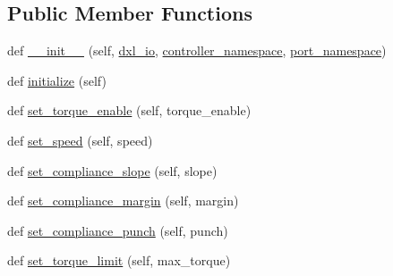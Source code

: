 \subsection*{Public Member Functions}
\begin{DoxyCompactItemize}
\item 
def \hyperlink{classdynamixel__controllers_1_1joint__torque__controller__dual__motor_1_1_joint_torque_controller_dual_motor_ac143e1d5e8d4ec9b2f1419a03e45092c}{\+\_\+\+\_\+init\+\_\+\+\_\+} (self, \hyperlink{classdynamixel__controllers_1_1joint__controller_1_1_joint_controller_a8be2fb1ed88aee6590c938122361c780}{dxl\+\_\+io}, \hyperlink{classdynamixel__controllers_1_1joint__controller_1_1_joint_controller_a8b34f86e463a0ce3fcf52a09b6ea7dc2}{controller\+\_\+namespace}, \hyperlink{classdynamixel__controllers_1_1joint__controller_1_1_joint_controller_ac89de71afa48761fb662ac2917a5b9d3}{port\+\_\+namespace})
\item 
def \hyperlink{classdynamixel__controllers_1_1joint__torque__controller__dual__motor_1_1_joint_torque_controller_dual_motor_a02bd4c16843e2e44bdd210395e83efb5}{initialize} (self)
\item 
def \hyperlink{classdynamixel__controllers_1_1joint__torque__controller__dual__motor_1_1_joint_torque_controller_dual_motor_adb706374f9a3e4a3cddb1ebafde0c15a}{set\+\_\+torque\+\_\+enable} (self, torque\+\_\+enable)
\item 
def \hyperlink{classdynamixel__controllers_1_1joint__torque__controller__dual__motor_1_1_joint_torque_controller_dual_motor_ad10fda7d37dcce2101585315ccaa6d2c}{set\+\_\+speed} (self, speed)
\item 
def \hyperlink{classdynamixel__controllers_1_1joint__torque__controller__dual__motor_1_1_joint_torque_controller_dual_motor_a18b2be85f08efbfbb5896a70912c5d2e}{set\+\_\+compliance\+\_\+slope} (self, slope)
\item 
def \hyperlink{classdynamixel__controllers_1_1joint__torque__controller__dual__motor_1_1_joint_torque_controller_dual_motor_a43e194e3d4940276e243111b6d2732ad}{set\+\_\+compliance\+\_\+margin} (self, margin)
\item 
def \hyperlink{classdynamixel__controllers_1_1joint__torque__controller__dual__motor_1_1_joint_torque_controller_dual_motor_afa78a656fb1a9e5f1b08f3d033de245c}{set\+\_\+compliance\+\_\+punch} (self, punch)
\item 
def \hyperlink{classdynamixel__controllers_1_1joint__torque__controller__dual__motor_1_1_joint_torque_controller_dual_motor_a642f142d5f8b18c8e556c0c0578eb95e}{set\+\_\+torque\+\_\+limit} (self, max\+\_\+torque)

\end{DoxyCompactItemize}
